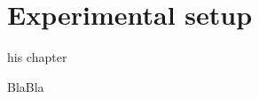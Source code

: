 \let\textcircled=\pgftextcircled
\chapter{Experimental setup} \label{sec:Experiment}

his chapter

BlaBla




\clearpage
